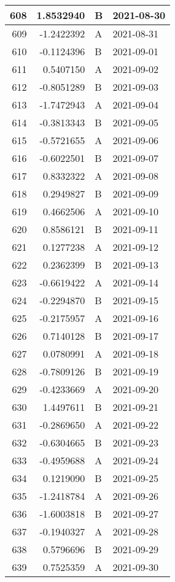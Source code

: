 \begin{tabular}{r|r|l|l}
\hline
608 & 1.8532940 & B & 2021-08-30\\
\hline
609 & -1.2422392 & A & 2021-08-31\\
\hline
610 & -0.1124396 & B & 2021-09-01\\
\hline
611 & 0.5407150 & A & 2021-09-02\\
\hline
612 & -0.8051289 & B & 2021-09-03\\
\hline
613 & -1.7472943 & A & 2021-09-04\\
\hline
614 & -0.3813343 & B & 2021-09-05\\
\hline
615 & -0.5721655 & A & 2021-09-06\\
\hline
616 & -0.6022501 & B & 2021-09-07\\
\hline
617 & 0.8332322 & A & 2021-09-08\\
\hline
618 & 0.2949827 & B & 2021-09-09\\
\hline
619 & 0.4662506 & A & 2021-09-10\\
\hline
620 & 0.8586121 & B & 2021-09-11\\
\hline
621 & 0.1277238 & A & 2021-09-12\\
\hline
622 & 0.2362399 & B & 2021-09-13\\
\hline
623 & -0.6619422 & A & 2021-09-14\\
\hline
624 & -0.2294870 & B & 2021-09-15\\
\hline
625 & -0.2175957 & A & 2021-09-16\\
\hline
626 & 0.7140128 & B & 2021-09-17\\
\hline
627 & 0.0780991 & A & 2021-09-18\\
\hline
628 & -0.7809126 & B & 2021-09-19\\
\hline
629 & -0.4233669 & A & 2021-09-20\\
\hline
630 & 1.4497611 & B & 2021-09-21\\
\hline
631 & -0.2869650 & A & 2021-09-22\\
\hline
632 & -0.6304665 & B & 2021-09-23\\
\hline
633 & -0.4959688 & A & 2021-09-24\\
\hline
634 & 0.1219090 & B & 2021-09-25\\
\hline
635 & -1.2418784 & A & 2021-09-26\\
\hline
636 & -1.6003818 & B & 2021-09-27\\
\hline
637 & -0.1940327 & A & 2021-09-28\\
\hline
638 & 0.5796696 & B & 2021-09-29\\
\hline
639 & 0.7525359 & A & 2021-09-30\\

\end{tabular}
